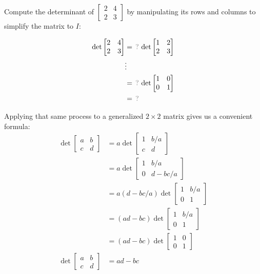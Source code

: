 \begin{applicationActivities}
\begin{activity}{10}
  Compute the determinant of \(\begin{bmatrix} 2 & 4 \\ 2 & 3 \end{bmatrix}\) 
  by manipulating its rows and columns to simplify the matrix to \(I\):

  \begin{align*}
    \det\begin{bmatrix} 2 & 4 \\ 2 & 3 \end{bmatrix}
      &=
    \unknown \det \begin{bmatrix} 1 & 2 \\ 2 & 3 \end{bmatrix}\\
      &\vdots\\
      &=
    \unknown \det \begin{bmatrix} 1 & 0 \\ 0 & 1 \end{bmatrix}\\
      &=
    \unknown
  \end{align*}
\end{activity}

\begin{fact}
  Applying that same process to a generalized \(2\times 2\)
  matrix gives us a convenient formula:
    \begin{align*}
    \det\begin{bmatrix} a & b \\ c & d \end{bmatrix}
  &=
    a
    \det\begin{bmatrix} 1 & b/a \\ c & d \end{bmatrix}
  \\ &=
    a
    \det\begin{bmatrix} 1 & b/a \\ 0 & d-bc/a \end{bmatrix}
  \\ &=
    a(d-bc/a)
    \det\begin{bmatrix} 1 & b/a \\ 0 & 1 \end{bmatrix}
  \\ &=
    (ad-bc)
    \det\begin{bmatrix} 1 & b/a \\ 0 & 1 \end{bmatrix}
  \\ &=
    (ad-bc)
    \det\begin{bmatrix} 1 & 0 \\ 0 & 1 \end{bmatrix}
  \\ 
    \det\begin{bmatrix} a & b \\ c & d \end{bmatrix}
  &=
    ad-bc
    \end{align*}
\end{fact}


\end{applicationActivities}
